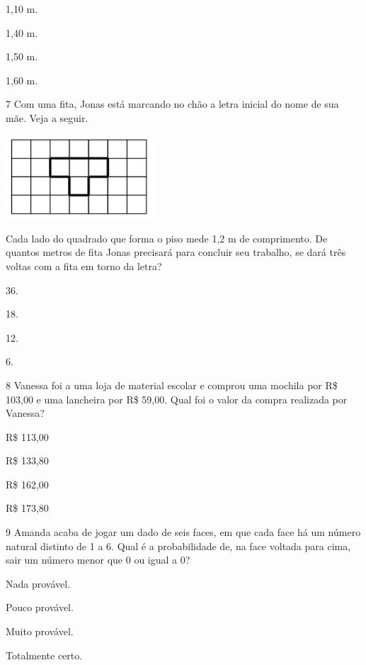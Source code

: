 \begin{mdframed}[linewidth=2pt,linecolor=salmao,roundcorner=2pt]
\begin{escolha}
{\begin{escolha}
\begin{escolha}
\item
  1,10 m.
\item
  1,40 m.
\item
  1,50 m.
\item
  1,60 m.
\end{escolha}

\num{7} Com uma fita, Jonas está marcando no chão a letra inicial do nome de
sua mãe. Veja a seguir.

\includegraphics[width=2.17519in,height=1.22511in]{media/image155.png}

Cada lado do quadrado que forma o piso mede 1,2 m de
comprimento. De quantos metros de fita Jonas precisará para concluir seu
trabalho, se dará três voltas com a fita em torno da letra?

\begin{escolha}
\item
  36.
\item
  18.
\item
  12.
\item
  6.
\end{escolha}


\num{8} Vanessa foi a uma loja de material escolar e comprou uma mochila por R\$ 103,00 e uma lancheira por R\$ 59,00. Qual foi o valor da compra realizada por Vanessa?

\begin{escolha}
\item
  R\$ 113,00
\item
  R\$ 133,80
\item
  R\$ 162,00
\item
  R\$ 173,80
\end{escolha}


\num{9} Amanda acaba de jogar um dado de seis faces, em que cada face
há um número natural distinto de 1 a 6. Qual é a probabilidade de, na
face voltada para cima, sair um número menor que 0 ou igual a 0?

\begin{escolha}
\item
  Nada provável.
\item
  Pouco provável.
\item
  Muito provável.
\item
  Totalmente certo.
\end{escolha}



\end{escolha}}
\end{escolha}
\end{mdframed}
